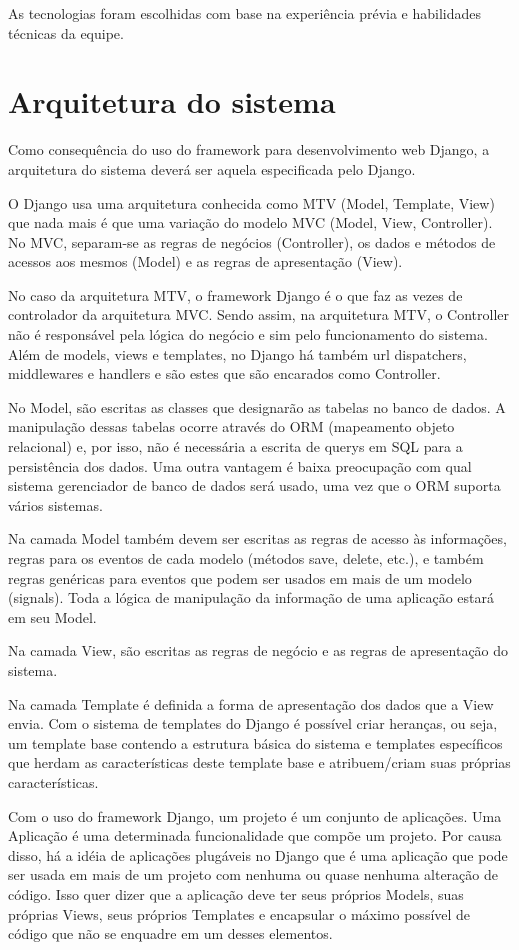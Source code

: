 \documentclass[a4paper,12pt,font=plain,header=plain]{abnt}
\begin{document}
	As tecnologias foram escolhidas com base na experiência prévia e habilidades técnicas da equipe.

  	\chapter{Arquitetura do sistema}

	Como consequência do uso do framework para desenvolvimento web Django, a arquitetura do sistema deverá ser aquela especificada pelo Django.

	O Django usa uma arquitetura conhecida como MTV (Model, Template, View) que nada mais é que uma variação do modelo MVC (Model, View, Controller). No MVC, separam-se as regras de negócios (Controller), os dados e métodos de acessos aos mesmos (Model) e as regras de apresentação (View).

	No caso da arquitetura MTV, o framework Django é o que faz as vezes de controlador da arquitetura MVC. Sendo assim, na arquitetura MTV, o Controller não é responsável pela lógica do negócio e sim pelo funcionamento do sistema. Além de models, views e templates, no Django há também url dispatchers, middlewares e handlers e são estes que são encarados como Controller.

	No Model, são escritas as classes que designarão as tabelas no banco de dados. A manipulação dessas tabelas ocorre através do ORM (mapeamento objeto relacional) e, por isso, não é necessária a escrita de querys em SQL para a persistência dos dados. Uma outra vantagem é baixa preocupação com qual sistema gerenciador de banco de dados será usado, uma vez que o ORM suporta vários sistemas.

	Na camada Model também devem ser escritas as regras de acesso às informações, regras para os eventos de cada modelo (métodos save, delete, etc.), e também regras genéricas para eventos que podem ser usados em mais de um modelo (signals). Toda a lógica de manipulação da informação de uma aplicação estará em seu Model.

	Na camada View, são escritas as regras de negócio e as regras de apresentação do sistema.

	Na camada Template é definida a forma de apresentação dos dados que a View envia. Com o sistema de templates do Django é possível criar heranças, ou seja, um template base contendo a estrutura básica do sistema e templates específicos que herdam as características deste template base e atribuem/criam suas próprias características.

	Com o uso do framework Django, um projeto é um conjunto de aplicações. Uma Aplicação é uma determinada funcionalidade que compõe um projeto. Por causa disso, há a idéia de aplicações plugáveis no Django que é uma aplicação que pode ser usada em mais de um projeto com nenhuma ou quase nenhuma alteração de código. Isso quer dizer que a aplicação deve ter seus próprios Models, suas próprias Views, seus próprios Templates e encapsular o máximo possível de código que não se enquadre em um desses elementos.
\end{document}
